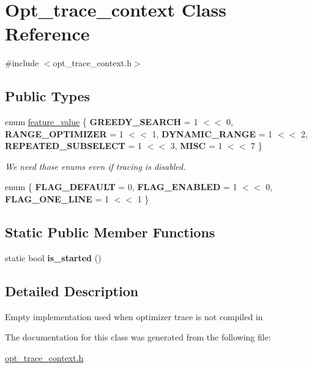 \hypertarget{classOpt__trace__context}{}\section{Opt\+\_\+trace\+\_\+context Class Reference}
\label{classOpt__trace__context}


{\ttfamily \#include $<$opt\+\_\+trace\+\_\+context.\+h$>$}

\subsection*{Public Types}
\begin{DoxyCompactItemize}
\item 
\mbox{\label{classOpt__trace__context_a71428b27f932674f6b2535ee6c30845c}} 
enum \mbox{\hyperlink{classOpt__trace__context_a71428b27f932674f6b2535ee6c30845c}{feature\+\_\+value}} \{ \newline
{\bfseries G\+R\+E\+E\+D\+Y\+\_\+\+S\+E\+A\+R\+CH} = 1 $<$$<$ 0, 
{\bfseries R\+A\+N\+G\+E\+\_\+\+O\+P\+T\+I\+M\+I\+Z\+ER} = 1 $<$$<$ 1, 
{\bfseries D\+Y\+N\+A\+M\+I\+C\+\_\+\+R\+A\+N\+GE} = 1 $<$$<$ 2, 
{\bfseries R\+E\+P\+E\+A\+T\+E\+D\+\_\+\+S\+U\+B\+S\+E\+L\+E\+CT} = 1 $<$$<$ 3, 
\newline
{\bfseries M\+I\+SC} = 1 $<$$<$ 7
 \}
\begin{DoxyCompactList}\small\item\em We need those enums even if tracing is disabled. \end{DoxyCompactList}\item 
\mbox{\label{classOpt__trace__context_a79bf4abf3fe9ea6c3bc19b50f20fc12f}} 
enum \{ {\bfseries F\+L\+A\+G\+\_\+\+D\+E\+F\+A\+U\+LT} = 0, 
{\bfseries F\+L\+A\+G\+\_\+\+E\+N\+A\+B\+L\+ED} = 1 $<$$<$ 0, 
{\bfseries F\+L\+A\+G\+\_\+\+O\+N\+E\+\_\+\+L\+I\+NE} = 1 $<$$<$ 1
 \}
\end{DoxyCompactItemize}
\subsection*{Static Public Member Functions}
\begin{DoxyCompactItemize}
\item 
\mbox{\label{classOpt__trace__context_a507d73a3324a4a77fd4ccaf7b5fcbb40}} 
static bool {\bfseries is\+\_\+started} ()
\end{DoxyCompactItemize}


\subsection{Detailed Description}
Empty implementation used when optimizer trace is not compiled in 

The documentation for this class was generated from the following file\+:\begin{DoxyCompactItemize}
\item 
\mbox{\hyperlink{opt__trace__context_8h}{opt\+\_\+trace\+\_\+context.\+h}}\end{DoxyCompactItemize}
